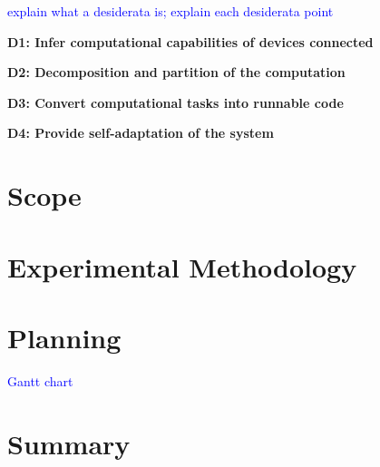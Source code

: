 \textcolor{blue}{explain what a desiderata is; explain each desiderata point}

\noindent
\textbf{D1: Infer computational capabilities of devices connected}

\noindent
\textbf{D2: Decomposition and partition of the computation}

\noindent
\textbf{D3: Convert computational tasks into runnable code}

\noindent
\textbf{D4: Provide self-adaptation of the system}

\section{Scope}\label{sec:scope}



\section{Experimental Methodology}\label{sec:exp_meth}

\section{Planning}\label{sec:planning}

\textcolor{blue}{Gantt chart}

\section{Summary}\label{sec:stat_summary}
